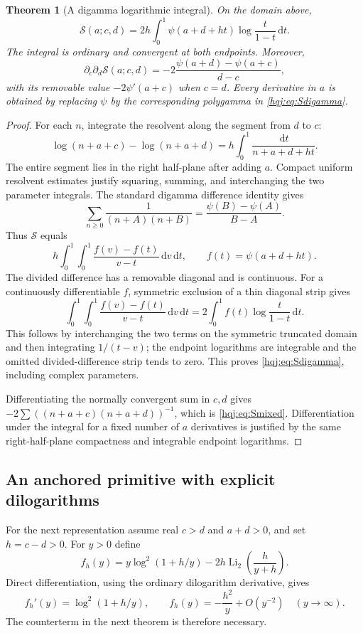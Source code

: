 \documentclass[11pt,letterpaper]{article}
\numberwithin{equation}{section}
\newtheorem{theorem}{Theorem}[section]
\theoremstyle{definition}
\newcommand{\Li}{\operatorname{Li}}
\newcommand{\dd}{\,\mathrm{d}}
\begin{document}
\begin{theorem}[A digamma logarithmic integral]\label{hqj:thm:gamma-square}
On the domain above,
\begin{equation}\label{hqj:eq:Sdigamma}
\boxed{\mathscr S(a;c,d)=2h\int_0^1
\psi(a+d+ht)\log\frac{t}{1-t}\dd t.}
\end{equation}
The integral is ordinary and convergent at both endpoints. Moreover,
\begin{equation}\label{hqj:eq:Smixed}
\partial_c\partial_d\mathscr S(a;c,d)
=-2\frac{\psi(a+d)-\psi(a+c)}{d-c},
\end{equation}
with its removable value $-2\psi'(a+c)$ when $c=d$.
Every derivative in $a$ is obtained by replacing $\psi$ by the
corresponding polygamma in \eqref{hqj:eq:Sdigamma}.
\end{theorem}
\begin{proof}
For each $n$, integrate the resolvent along the segment from $d$ to $c$:
\[
\log(n+a+c)-\log(n+a+d)
=h\int_0^1\frac{\dd t}{n+a+d+ht}.
\]
The entire segment lies in the right half-plane after adding $a$.
Compact uniform resolvent estimates justify squaring, summing, and
interchanging the two parameter integrals. The standard digamma
difference identity gives
\[
\sum_{n\ge0}\frac1{(n+A)(n+B)}
=\frac{\psi(B)-\psi(A)}{B-A}.
\]
Thus $\mathscr S$ equals
\[
h\int_0^1\int_0^1
\frac{f(v)-f(t)}{v-t}\dd v\dd t,
\qquad f(t)=\psi(a+d+ht).
\]
The divided difference has a removable diagonal and is continuous.
For a continuously differentiable $f$, symmetric exclusion of a thin
diagonal strip gives
\[
\int_0^1\int_0^1\frac{f(v)-f(t)}{v-t}\dd v\dd t
=2\int_0^1f(t)\log\frac{t}{1-t}\dd t.
\]
This follows by interchanging the two terms on the symmetric truncated
domain and then integrating $1/(t-v)$; the endpoint logarithms are
integrable and the omitted divided-difference strip tends to zero.
This proves \eqref{hqj:eq:Sdigamma}, including complex parameters.

Differentiating the normally convergent sum in $c,d$ gives
$-2\sum((n+a+c)(n+a+d))^{-1}$, which is
\eqref{hqj:eq:Smixed}. Differentiation under the integral for a fixed
number of $a$ derivatives is justified by the same right-half-plane
compactness and integrable endpoint logarithms.
\end{proof}

\subsection{An anchored primitive with explicit dilogarithms}
For the next representation assume real $c>d$ and $a+d>0$, and set $h=c-d>0$.
For $y>0$ define
\begin{equation}\label{hqj:eq:fprimitive}
f_h(y)=y\log^2(1+h/y)-2h\Li_2\!\left(\frac{h}{y+h}\right).
\end{equation}
Direct differentiation, using the ordinary dilogarithm derivative,
gives
\begin{equation}\label{hqj:eq:fderivative}
f_h'(y)=\log^2(1+h/y),\qquad
f_h(y)=-\frac{h^2}{y}+O(y^{-2})\quad(y\longrightarrow\infty).
\end{equation}
The counterterm in the next theorem is therefore necessary.
\end{document}
